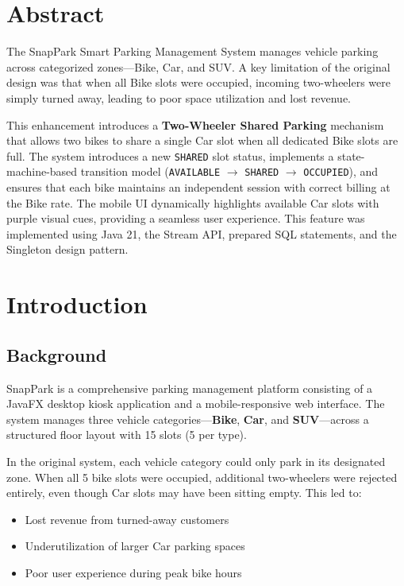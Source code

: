 \documentclass[12pt,a4paper]{article}
\begin{document}
\newpage
\section*{Abstract}

The SnapPark Smart Parking Management System manages vehicle parking across categorized zones---Bike, Car, and SUV. A key limitation of the original design was that when all Bike slots were occupied, incoming two-wheelers were simply turned away, leading to poor space utilization and lost revenue.

This enhancement introduces a \textbf{Two-Wheeler Shared Parking} mechanism that allows two bikes to share a single Car slot when all dedicated Bike slots are full. The system introduces a new \texttt{SHARED} slot status, implements a state-machine-based transition model (\texttt{AVAILABLE} $\rightarrow$ \texttt{SHARED} $\rightarrow$ \texttt{OCCUPIED}), and ensures that each bike maintains an independent session with correct billing at the Bike rate. The mobile UI dynamically highlights available Car slots with purple visual cues, providing a seamless user experience. This feature was implemented using Java 21, the Stream API, prepared SQL statements, and the Singleton design pattern.

\newpage
\tableofcontents
\newpage

\section{Introduction}

\subsection{Background}
SnapPark is a comprehensive parking management platform consisting of a JavaFX desktop kiosk application and a mobile-responsive web interface. The system manages three vehicle categories---\textbf{Bike}, \textbf{Car}, and \textbf{SUV}---across a structured floor layout with 15 slots (5 per type).

In the original system, each vehicle category could only park in its designated zone. When all 5 bike slots were occupied, additional two-wheelers were rejected entirely, even though Car slots may have been sitting empty. This led to:
\begin{itemize}[noitemsep]
    \item Lost revenue from turned-away customers
    \item Underutilization of larger Car parking spaces
    \item Poor user experience during peak bike hours
\end{itemize}
\end{document}
